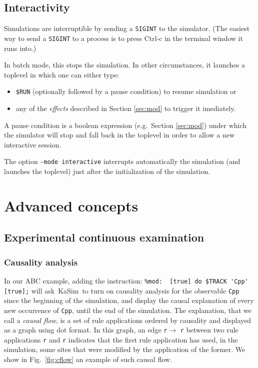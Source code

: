 \documentclass[11pt]{book}
\def\KaSim{\textsf{KaSim}}
\def\ttt#1{\texttt{#1}}
\def\noi{\noindent}
\def\eg{e.g.~}
\begin{document}
\section{Interactivity}
Simulations are interruptible by sending a \verb:SIGINT: to the
simulator. (The easiest way to send a \verb:SIGINT: to a process is to
press Ctrl-c in the terminal window it runs into.)

In batch mode, this stops the simulation. In other circumstances, it
launches a toplevel in which one can either type:
\begin{itemize}
\item \verb:$RUN: (optionally followed by a pause condition) to resume
  simulation or
\item any of the \emph{effects} described in Section \ref{sec:mod} to trigger it imediately.
\end{itemize}

A pause condition is a boolean expression ({\eg}Section \ref{sec:mod}) under which the simulator will stop and fall back in
the toplevel in order to allow a new interactive session.

The option \ttt{-mode interactive} interrupts automatically the
simulation (and launches the toplevel) just after the initialization
of the simulation.

\chapter{Advanced concepts}\label{chap:advanced}

\section{Experimental continuous examination}
\subsection{Causality analysis}\label{sec:cflows}

In our ABC example, adding the instruction:
\lstinline[language=kappa]!%mod:  [true] do $TRACK 'Cpp' [true];!
\noi will ask~\KaSim~to turn on causality analysis for the observable \ttt{{\textquotesingle}Cpp{\textquotesingle}} since the beginning of the simulation, and display the causal explanation of every new occurrence of \ttt{{\textquotesingle}Cpp{\textquotesingle}}, until the end of the simulation. The explanation, that we call a \emph{causal flow}, is a set of rule applications ordered by causality and displayed as a graph using dot format. In this graph, an edge \ttt{r}$\longrightarrow$ \ttt{r{\textquotesingle}} between two rule applications \ttt{r} and \ttt{r{\textquotesingle}} indicates that the first rule application has used, in the simulation, some sites that were modified by the application of the former. We show in Fig.~\ref{fig:cflow} an example of such causal flow.
\end{document}
